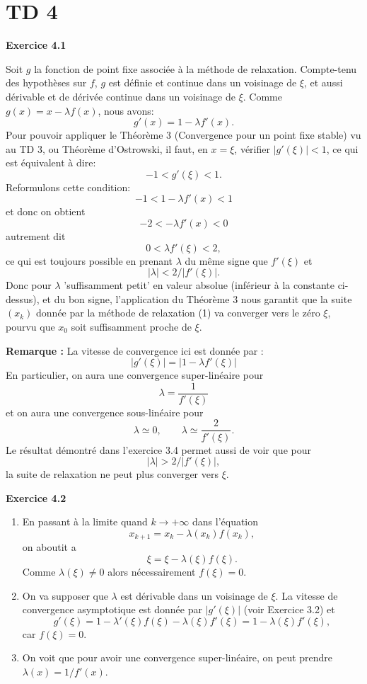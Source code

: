 \documentclass{article}
\begin{document}
\newpage

\section{TD 4}

{\bf Exercice 4.1}

Soit $g$ la fonction de point fixe associée à la méthode de relaxation.
Compte-tenu des hypothèses sur $f$, $g$ est définie et continue dans un voisinage de $\xi$, et aussi dérivable et de dérivée continue dans un voisinage de $\xi$.
Comme $g(x) = x - \lambda f(x)$, nous avons:
\[
g'(x) = 1 - \lambda f'(x).
\]
Pour pouvoir appliquer le Théorème 3 (Convergence pour un point fixe stable) vu au TD 3, ou Théorème d'Ostrowski, il faut,
en $x=\xi$, vérifier $|g'(\xi)| < 1$, ce qui est équivalent à dire:
\[
-1 < g'(\xi) < 1.
\]
Reformulons cette condition:
$$
-1< 1  - \lambda f'(x) < 1
$$
et donc on obtient
$$
-2< - \lambda f'(x) < 0
$$
autrement dit
\[
0 < \lambda f'(\xi) < 2,
\]
ce qui est toujours possible en prenant $\lambda$ du même signe que $f'(\xi)$ et
\[
|\lambda| < 2/|f'(\xi)|.
\]
Donc pour $\lambda$ 'suffisamment petit' en valeur absolue (inférieur à la constante ci-dessus), et du bon signe, l'application du Théorème 3 nous garantit que la suite $(x_k)$ donnée par la méthode de relaxation (1) va converger vers le zéro $\xi$, pourvu que $x_0$ soit suffisamment proche de $\xi$.

{\bf Remarque :} La vitesse de convergence ici est donnée par :
\[
|g'(\xi)| = | 1 - \lambda f'(\xi) |
\]
En particulier, on aura une convergence super-linéaire pour 
\[
\lambda = \frac{1}{f'(\xi)}
\]
et on aura une convergence sous-linéaire pour
\[
\lambda \simeq 0, \qquad \lambda \simeq \frac{2}{f'(\xi)}.
\]
Le résultat démontré dans l'exercice 3.4 permet aussi de voir que pour
\[
|\lambda| > 2/|f'(\xi)|,
\]
la suite de relaxation ne peut plus converger vers $\xi$.

\medskip

{\bf Exercice 4.2}

\begin{enumerate}
    \item En passant à la limite quand $k \rightarrow +\infty$ dans l'équation 
    $$
    x_{k+1} = x_k - \lambda(x_k)f(x_k),
    $$
    on aboutit a 
    \[
    \xi = \xi - \lambda(\xi) f(\xi).
    \]
    Comme $\lambda(\xi)\neq0$ alors nécessairement $f(\xi)=0$.
    
    \item 
    On va supposer que $\lambda$ est dérivable dans un voisinage de $\xi$.
    La vitesse de convergence asymptotique est donnée par $|g'(\xi)|$ (voir Exercice 3.2) et
    \[
    g'(\xi) = 1 - \lambda'(\xi) f(\xi) - \lambda(\xi) f'(\xi) = 1 -\lambda(\xi)f'(\xi),
    \]
    car $f(\xi)=0$.
    
    \item On voit que pour avoir une convergence super-linéaire, on peut prendre $\lambda(x) = 1/f'(x)$.
\end{enumerate}
\end{document}
